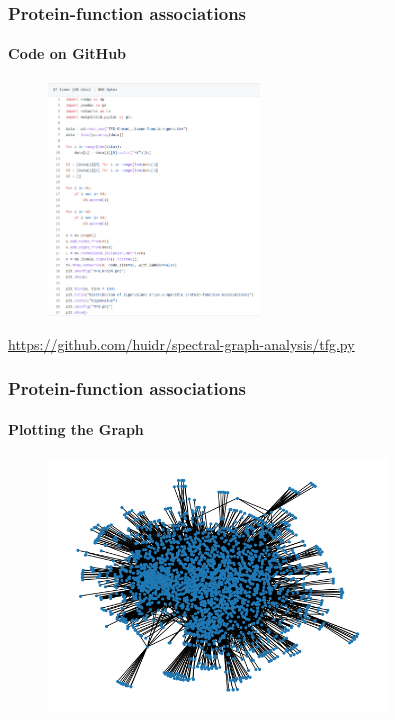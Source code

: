 \documentclass[aspectratio=43,leqno]{beamer}
\begin{document}
\begin{frame}
  \frametitle{Protein-function associations}
  \framesubtitle{Code on GitHub}

 \begin{figure}[h]
    \centering
    \includegraphics[width=0.5\textwidth]{images/tfg-code.png}
    \label{fig:mesh1}
  \end{figure}
  \hyperref{https://github.com/huidr/spectral-graph-analysis/tfg.py}{}{}{https://github.com/huidr/spectral-graph-analysis/tfg.py}
  
\end{frame}

\begin{frame}
  \frametitle{Protein-function associations}
  \framesubtitle{Plotting the Graph}

 \begin{figure}[h]
    \centering
    \includegraphics[width=0.8\textwidth]{images/tfg-graph.png}
    \label{fig:mesh1}
  \end{figure}
  
\end{frame}
\end{document}
